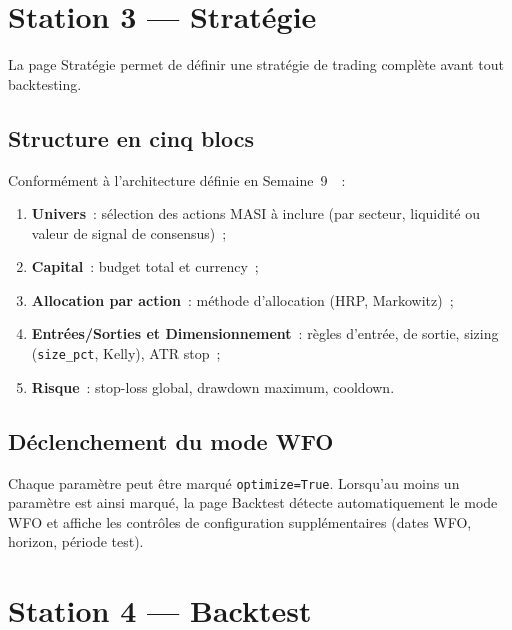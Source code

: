 \section{Station 3 --- Stratégie}
\label{sec:station_strategie}

La page Stratégie permet de définir une stratégie de trading complète avant
tout backtesting.

\subsection{Structure en cinq blocs}

Conformément à l'architecture définie en Semaine~9~\cite{rapport_s9}~:

\begin{enumerate}
    \item \textbf{Univers}~: sélection des actions MASI à inclure (par secteur,
    liquidité ou valeur de signal de consensus)~;
    \item \textbf{Capital}~: budget total et currency~;
    \item \textbf{Allocation par action}~: méthode d'allocation (HRP, Markowitz)~;
    \item \textbf{Entrées/Sorties et Dimensionnement}~: règles d'entrée, de sortie,
    sizing (\texttt{size\_pct}, Kelly), ATR stop~;
    \item \textbf{Risque}~: stop-loss global, drawdown maximum, cooldown.
\end{enumerate}

\subsection{Déclenchement du mode WFO}

Chaque paramètre peut être marqué \texttt{optimize=True}. Lorsqu'au moins un paramètre
est ainsi marqué, la page Backtest détecte automatiquement le mode WFO et affiche les
contrôles de configuration supplémentaires (dates WFO, horizon, période test).


\section{Station 4 --- Backtest}
\label{sec:station_backtest}

